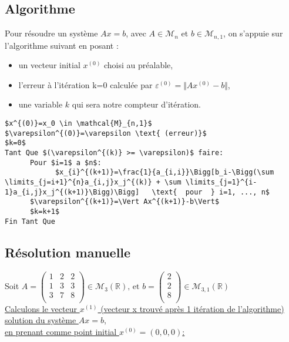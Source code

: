 \documentclass{report}
\begin{document}
\subsection{Algorithme}
Pour résoudre un système $Ax=b$, avec $A \in \mathcal{M}_{n}$ et $b\in \mathcal{M}_{n,1}$, on s'appuie sur l'algorithme suivant en posant :
\begin{itemize}
  \item un vecteur initial $x^{(0)}$ choisi au préalable,
  \item l'erreur à l'itération k=0 calculée par $\varepsilon^{(0)}=\Vert Ax^{(0)}-b\Vert$,
  \item une variable $k$ qui sera notre compteur d'itération.
\end{itemize}\vspace{6pt}
\label{algogs}
\begin{lstlisting}[mathescape=true, frame=single, basicstyle=\linespread{1.5}\fontsize{8}{10}\selectfont]
$x^{(0)}=x_0 \in \mathcal{M}_{n,1}$
$\varepsilon^{(0)}=\varepsilon \text{ (erreur)}$
$k=0$
Tant Que $(\varepsilon^{(k)} >= \varepsilon)$ faire:
      Pour $i=1$ a $n$:
            $x_{i}^{(k+1)}=\frac{1}{a_{i,i}}\Bigg[b_i-\Bigg(\sum \limits_{j=i+1}^{n}a_{i,j}x_j^{(k)} + \sum \limits_{j=1}^{i-1}a_{i,j}x_j^{(k+1)}\Bigg)\Bigg]   \text{  pour  } i=1, ..., n$
      $\varepsilon^{(k+1)}=\Vert Ax^{(k+1)}-b\Vert$
      $k=k+1$
Fin Tant Que
\end{lstlisting}
\subsection{Résolution manuelle}
\vspace{10pt}
Soit $A=
\begin{pmatrix}
  1 & 2 & 2 \\
  1 & 3 & 3 \\
  3 & 7 & 8 \\
\end{pmatrix} \in \mathcal{M}_{3}(\mathbb{R}) \text{, et } 
b=
\begin{pmatrix}
  2 \\
  2 \\
  8 \\
\end{pmatrix} \in \mathcal{M}_{3, 1}(\mathbb{R})$\vspace{10pt}\\
\underline{Calculons le vecteur $x^{(1)}$ (vecteur x trouvé après 1 itération de l'algorithme) solution du système $Ax=b$, }\vspace{10pt}\\
\underline{en prenant comme point initial $x^{(0)}=(0,0,0)$:} \\
\end{document}

